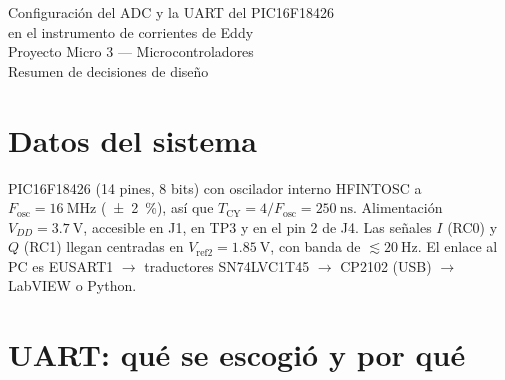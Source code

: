 \documentclass[11pt,letterpaper]{article}
\begin{document}
\begin{center}
  {\LARGE Configuración del ADC y la UART del PIC16F18426\\[0.25em]
  en el instrumento de corrientes de Eddy}\\[0.9em]
  {\large Proyecto Micro 3 --- Microcontroladores}\\[0.3em]
  {\small Resumen de decisiones de diseño}
\end{center}

\vspace{0.6em}
\begin{abstract}
\noindent
El PIC16F18426 digitaliza las componentes en fase ($I$) y en cuadratura ($Q$) que entrega la placa de demodulación y las envía a un PC por UART. Este documento reúne, en un solo lugar, \emph{qué} se escogió para el ADC y la UART y \emph{por qué}, con los cálculos mínimos de cada valor. Los datos viajan como texto ASCII, una línea \texttt{2048,2051\textbackslash r\textbackslash n} por par. Resultado: muestreo de $I$ y $Q$ a \SI{1}{\kilo\hertz} disparado por hardware, enlace a \num{115200} baudios 8N1 y una línea cada dos pares (500 líneas/s), que ocupa el \SI{48}{\percent} de la línea; una línea por par la dejaría al \SI{96}{\percent}, sin margen.
\end{abstract}

\section{Datos del sistema}

\noindent
PIC16F18426 (14 pines, 8 bits) con oscilador interno HFINTOSC a $F_\text{osc} = \SI{16}{\mega\hertz}$ (\SI{+-2}{\percent}), así que $T_\text{CY} = 4/F_\text{osc} = \SI{250}{\nano\second}$. Alimentación $V_{DD} = \SI{3.7}{\volt}$, accesible en J1, en TP3 y en el pin 2 de J4. Las señales $I$ (RC0) y $Q$ (RC1) llegan centradas en $V_\text{ref2} = \SI{1.85}{\volt}$, con banda de $\lesssim \SI{20}{\hertz}$. El enlace al PC es EUSART1 $\rightarrow$ traductores SN74LVC1T45 $\rightarrow$ CP2102 (USB) $\rightarrow$ LabVIEW o Python.

\section{UART: qué se escogió y por qué}
\end{document}
